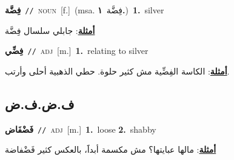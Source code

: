 \documentclass[10pt,a4paper,twoside]{article} %
\begin{document}
\begin{multicols}{2}
{\setlength\topsep{0pt}\textbf{\foreignlanguage{arabic}{فِضَّة}}\ {\color{gray}\texttt{//}\color{black}}\ \textsc{noun}\ [f.]\ \color{gray}(msa. \foreignlanguage{arabic}{فِضَّة}~\foreignlanguage{arabic}{\textbf{١.}})\color{black}\ \textbf{1.}~silver\  \begin{flushright}\color{gray}\foreignlanguage{arabic}{\textbf{\underline{\foreignlanguage{arabic}{أمثلة}}}: جابلي سلسال فِضَّة}\end{flushright}\color{black}} \vspace{2mm}

{\setlength\topsep{0pt}\textbf{\foreignlanguage{arabic}{فِضِّي}}\ {\color{gray}\texttt{//}\color{black}}\ \textsc{adj}\ [m.]\ \textbf{1.}~relating to silver\  \begin{flushright}\color{gray}\foreignlanguage{arabic}{\textbf{\underline{\foreignlanguage{arabic}{أمثلة}}}: الكاسة الفِضِّية مش كثير حلوة. حطي الذهبية أحلى وأرتب.}\end{flushright}\color{black}} \vspace{2mm}

\vspace{-3mm}
\subsection*{\color{blue}\foreignlanguage{arabic}{ف.ض.ف.ض}\color{blue}{}} 

{\setlength\topsep{0pt}\textbf{\foreignlanguage{arabic}{فَضْفَاض}}\ {\color{gray}\texttt{//}\color{black}}\ \textsc{adj}\ [m.]\ \textbf{1.}~loose  \textbf{2.}~shabby\  \begin{flushright}\color{gray}\foreignlanguage{arabic}{\textbf{\underline{\foreignlanguage{arabic}{أمثلة}}}: مالها عبايتها؟ مش مكسمة أبداََ، بالعكس كثير فَضْفاضة}\end{flushright}\color{black}} \vspace{2mm}


\end{multicols}
\end{document}
